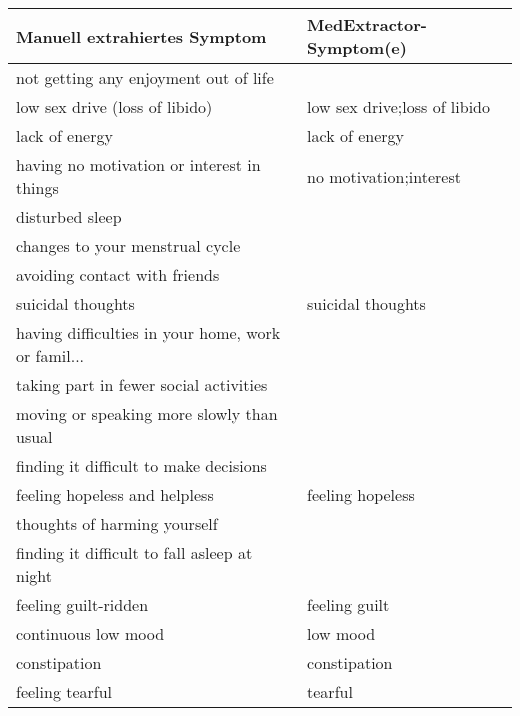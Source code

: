\begin{table}
\begin{center}
\begin{tabular}{ll}
\toprule
                      Manuell extrahiertes Symptom &       MedExtractor-Symptom(e) \\
\midrule
             not getting any enjoyment out of life &                               \\
                    low sex drive (loss of libido) &  low sex drive;loss of libido \\
                                    lack of energy &                lack of energy \\
        having no motivation or interest in things &        no motivation;interest \\
                                   disturbed sleep &                               \\
                   changes to your menstrual cycle &                               \\
                     avoiding contact with friends &                               \\
                                 suicidal thoughts &             suicidal thoughts \\
having difficulties in your home, work or famil... &                               \\
            taking part in fewer social activities &                               \\
         moving or speaking more slowly than usual &                               \\
            finding it difficult to make decisions &                               \\
                     feeling hopeless and helpless &              feeling hopeless \\
                      thoughts of harming yourself &                               \\
      finding it difficult to fall asleep at night &                               \\
                              feeling guilt-ridden &                 feeling guilt \\
                               continuous low mood &                      low mood \\
                                      constipation &                  constipation \\
                                   feeling tearful &                       tearful \\

\end{tabular}
\end{center}
\end{table}
